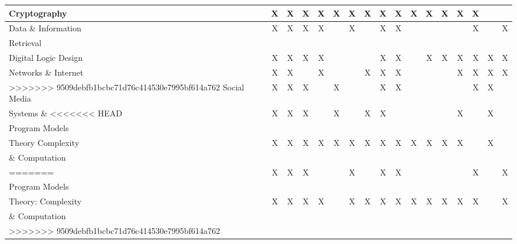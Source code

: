 \documentclass{article}
\begin{document}
{\begin{tabular}{|l||c|c|c|c|c|c|c|c|c|c|c|c|c|c|c|c|}
\hline
Cryptography 
   & X & X & X & X & X & X & X & X & X & X & X & X & X & X & &  \\
\hline
Data \& Information 
   & X & X & X & X & & X &  & X & X &  &  &  &  & X & & X \\
Retrieval
    &  &  &  &  &  &  &  &  &  &  &  & &  &  & & \\
\hline
Digital Logic Design 
   & X & X & X & X &  &  &  & X & X &  & X & X & X & X & X & X \\
\hline
Networks \& Internet
   & X & X & & X & & & X & X & X &  &  &  & X & X & X & X \\
>>>>>>> 9509debfb1bcbc71d76c414530e7995bf614a762
\hline
Social Media 
   & X & X & X &  & X &  &  & X & X &  &  &  &  & X & X &  \\
\hline
Systems \&     
<<<<<<< HEAD
  & X & X & X &  & X &  & X & X &  &  &  &  & X & & X \\
\hspace*{.1in}Program Models &  & &  &  &  &  & &  &  &  &  &  &  & & \\ 
\hline
Theory Complexity 
   & X & X & X & X & X & X & X & X & X & X & X & X & X & & X \\
\hspace*{.1in}\& Computation    &  &  & &  &  &  & &  &  &  &  &  &  & & \\
=======
  & X & X & X &  & & X &  & X & X &  &  &  &  & X & & X \\
Program Models &  &  & &  &  &  &  & &  &  &  &  &  &  &  & \\ 
\hline
Theory: Complexity 
   & X & X & X & X & & X & X & X & X & X & X & X & X & X & & X \\
\& Computation    &  &  &  &  &  &  &  & &  &  &  &  &  &  &  & \\
>>>>>>> 9509debfb1bcbc71d76c414530e7995bf614a762
\hline
\end{tabular}
}
\end{document}
